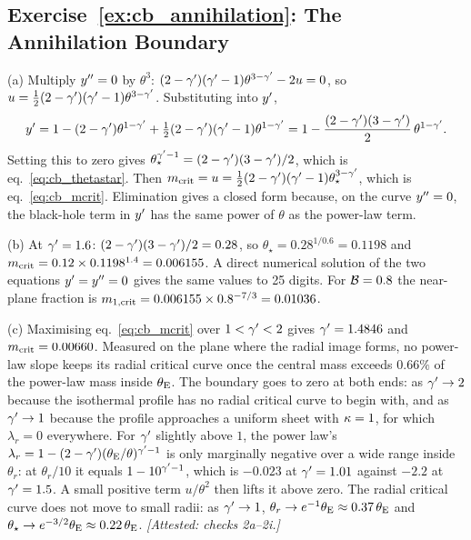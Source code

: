 \subsection*{Exercise~\ref{ex:cb_annihilation}: The Annihilation Boundary}

(a) Multiply $y''=0$ by $\theta^3$:
$(2-\gamma')(\gamma'-1)\theta^{3-\gamma'}-2u=0$, so
$u=\tfrac12(2-\gamma')(\gamma'-1)\theta^{3-\gamma'}$. Substituting into $y'$,
\begin{equation*}
  y'=1-(2-\gamma')\theta^{1-\gamma'}+\tfrac12(2-\gamma')(\gamma'-1)\theta^{1-\gamma'}
  =1-\frac{(2-\gamma')(3-\gamma')}{2}\,\theta^{1-\gamma'}.
\end{equation*}
Setting this to zero gives
$\theta_\star^{\gamma'-1}=(2-\gamma')(3-\gamma')/2$, which is
eq.~\eqref{eq:cb_thetastar}. Then
$m_{\rm crit}=u=\tfrac12(2-\gamma')(\gamma'-1)\theta_\star^{3-\gamma'}$, which is
eq.~\eqref{eq:cb_mcrit}. Elimination gives a closed form because, on the
curve $y''=0$, the black-hole term in $y'$ has the same power of
$\theta$ as the power-law term.

(b) At $\gamma'=1.6$: $(2-\gamma')(3-\gamma')/2=0.28$, so
$\theta_\star=0.28^{1/0.6}=0.1198$ and
$m_{\rm crit}=0.12\times0.1198^{1.4}=0.006155$. A direct numerical
solution of the two equations $y'=y''=0$ gives the same values to
25 digits. For $\mathcal{B}=0.8$ the near-plane fraction is
$m_{1,\rm crit}=0.006155\times0.8^{-7/3}=0.01036$.

(c) Maximising eq.~\eqref{eq:cb_mcrit} over $1<\gamma'<2$ gives
$\gamma'=1.4846$ and $m_{\rm crit}=0.00660$. Measured on the plane where
the radial image forms, no power-law slope keeps its radial critical
curve once the central mass exceeds $0.66\%$ of the power-law mass
inside $\theta_{\mathrm{E}}$. The boundary goes to zero at both ends: as $\gamma'\to2$
because the isothermal profile has no radial critical curve to begin
with, and as $\gamma'\to1$ because the profile approaches a uniform sheet
with $\kappa=1$, for which $\lambda_r=0$ everywhere. For $\gamma'$ slightly
above $1$, the power law's $\lambda_r=1-(2-\gamma')(\theta_{\mathrm{E}}/\theta)^{\gamma'-1}$
is only marginally negative over a wide range inside $\theta_r$: at
$\theta_r/10$ it equals $1-10^{\gamma'-1}$, which is $-0.023$ at $\gamma'=1.01$
against $-2.2$ at $\gamma'=1.5$. A small positive term $u/\theta^2$ then
lifts it above zero. The radial critical curve does not move to
small radii: as $\gamma'\to1$, $\theta_r\to e^{-1}\theta_{\mathrm{E}}\approx0.37\,\theta_{\mathrm{E}}$
and $\theta_\star\to e^{-3/2}\theta_{\mathrm{E}}\approx0.22\,\theta_{\mathrm{E}}$.
\emph{[Attested: checks 2a--2i.]}

